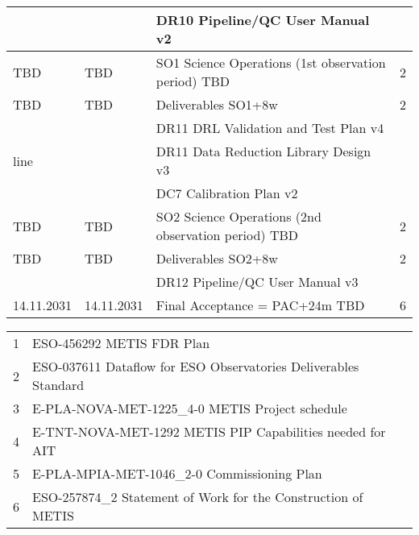 \begin{table}
\begin{tabularx}{\textwidth}{llll}
           &		   &	DR10 Pipeline/QC User Manual v2				    &	\\
\hline
TBD        &	TBD        &	SO1 Science Operations (1st observation period) TBD	    &	2 \\
\hline
TBD        &	TBD        &	Deliverables SO1+8w                                         &	2 \\
	   &		   &	DR11 DRL Validation and Test Plan v4			    &	\\
line	   &		   &	DR11 Data Reduction Library Design v3			    &	\\
	   &		   &	DC7 Calibration Plan v2					    &	\\
\hline
TBD        &	TBD        &	SO2 Science Operations (2nd observation period) TBD	    &	2 \\
\hline
TBD        &	TBD        &	Deliverables SO2+8w                                         &	2 \\
	   &		   &	DR12 Pipeline/QC User Manual v3				    &	\\
\hline
14.11.2031 &	14.11.2031 &	Final Acceptance  = PAC+24m  TBD			    &	6 \\
\hline\hline
\end{tabularx}			
\tiny
\begin{tabularx}{\textwidth}{ll}
1 & ESO-456292 METIS FDR Plan  \\
2 & ESO-037611 Dataflow for ESO Observatories Deliverables Standard \\
3 & E-PLA-NOVA-MET-1225_4-0 METIS Project schedule \\
4 & E-TNT-NOVA-MET-1292 METIS PIP Capabilities needed for AIT \\ 
5 & E-PLA-MPIA-MET-1046_2-0 Commissioning Plan \\
6 & ESO-257874_2 Statement of Work for the Construction of METIS \\
\end{tabularx} 




\end{table}

